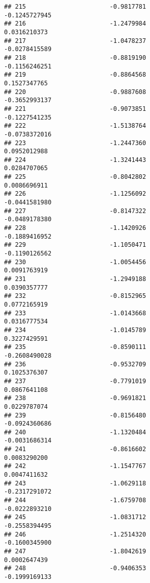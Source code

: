 \documentclass[
]{article}
\begin{document}
\begin{verbatim}
## 215                       -0.9817781                         -0.1245727945
## 216                       -1.2479984                          0.0316210373
## 217                       -1.0478237                         -0.0278415589
## 218                       -0.8819190                         -0.1156246251
## 219                       -0.8864568                          0.1527347765
## 220                       -0.9887608                         -0.3652993137
## 221                       -0.9073851                         -0.1227541235
## 222                       -1.5138764                         -0.0738372016
## 223                       -1.2447360                          0.0952012988
## 224                       -1.3241443                          0.0284707065
## 225                       -0.8042802                          0.0086696911
## 226                       -1.1256092                         -0.0441581980
## 227                       -0.8147322                         -0.0489178380
## 228                       -1.1420926                         -0.1889416952
## 229                       -1.1050471                         -0.1190126562
## 230                       -1.0054456                          0.0091763919
## 231                       -1.2949188                          0.0390357777
## 232                       -0.8152965                          0.0772165919
## 233                       -1.0143668                          0.0316777534
## 234                       -1.0145789                          0.3227429591
## 235                       -0.8590111                         -0.2608490028
## 236                       -0.9532709                          0.1025376307
## 237                       -0.7791019                          0.0867641108
## 238                       -0.9691821                          0.0229787074
## 239                       -0.8156480                         -0.0924360686
## 240                       -1.1320484                         -0.0031686314
## 241                       -0.8616602                          0.0083290200
## 242                       -1.1547767                          0.0047411632
## 243                       -1.0629118                         -0.2317291072
## 244                       -1.6759708                         -0.0222893210
## 245                       -1.0831712                         -0.2558394495
## 246                       -1.2514320                         -0.1600345900
## 247                       -1.8042619                          0.0002647439
## 248                       -0.9406353                         -0.1999169133

\end{verbatim}
\end{document}
